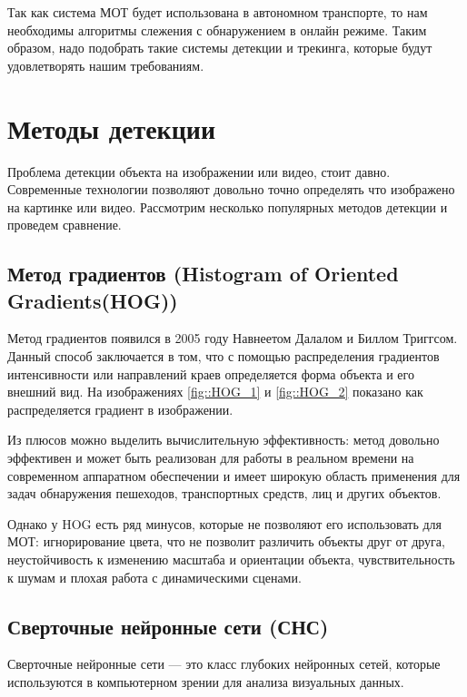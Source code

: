 Так как система МОТ будет использована в автономном транспорте, то нам необходимы алгоритмы слежения с обнаружением в онлайн режиме. Таким образом, надо подобрать такие системы детекции и трекинга, которые будут удовлетворять нашим требованиям.

\section{Методы детекции}

Проблема детекции объекта на изображении или видео, стоит давно. Современные технологии позволяют довольно точно определять что изображено на картинке или видео. Рассмотрим несколько популярных методов детекции и проведем сравнение.

\subsection{Метод градиентов (Histogram of Oriented Gradients(HOG))}

Метод градиентов появился в 2005 году Навнеетом Далалом и Биллом Триггсом. Данный способ заключается в том, что с помощью распределения градиентов интенсивности или направлений краев определяется форма объекта и его внешний вид. На изображениях \ref{fig::HOG_1} и \ref{fig::HOG_2} показано как распределяется градиент в изображении.




Из плюсов можно выделить вычислительную эффективность: метод довольно эффективен и может быть реализован для работы в реальном времени на современном аппаратном обеспечении и имеет широкую область применения для задач обнаружения пешеходов, транспортных средств, лиц и других объектов. 

Однако у HOG есть ряд минусов, которые не позволяют его использовать для МОТ: игнорирование цвета, что не позволит различить объекты друг от друга, неустойчивость к изменению масштаба и ориентации объекта, чувствительность к шумам и плохая работа с динамическими сценами.  

\subsection{Сверточные нейронные сети (СНС)}

Сверточные нейронные сети --- это класс глубоких нейронных сетей, которые используются в компьютерном зрении для анализа визуальных данных. 

